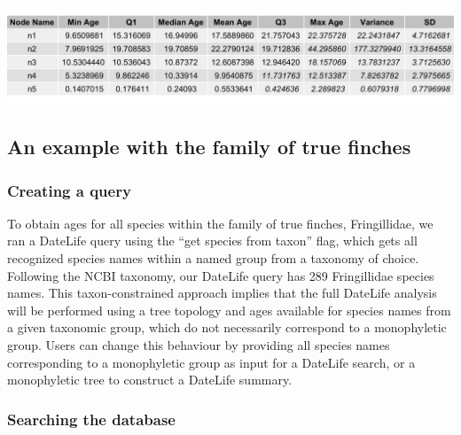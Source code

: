 \documentclass[english,man]{apa6}
\begin{document}
\vspace{15mm}


\label{tbl:table2}
\includegraphics[width=\linewidth]{../tables/table-fringillidae-small-example-summary.png}

\newpage

\hypertarget{an-example-with-the-family-of-true-finches}{%
\subsection{An example with the family of true finches}\label{an-example-with-the-family-of-true-finches}}

\hypertarget{creating-a-query}{%
\subsubsection{Creating a query}\label{creating-a-query}}

To obtain ages for all species within the family of true finches, Fringillidae, we ran a DateLife query using the \enquote{get species from taxon} flag,
which gets all recognized species names within a named group from a taxonomy of choice.
Following the NCBI taxonomy, our DateLife query has 289 Fringillidae species names.
This taxon-constrained approach implies that the full DateLife analysis will be performed using a tree topology and ages available for species names from a given taxonomic group, which do not necessarily correspond to a monophyletic group. Users can change this behaviour by providing all species names corresponding to a monophyletic group as input for a DateLife search, or a monophyletic tree to construct a DateLife summary.

\hypertarget{searching-the-database-1}{%
\subsubsection{Searching the database}\label{searching-the-database-1}}
\end{document}
